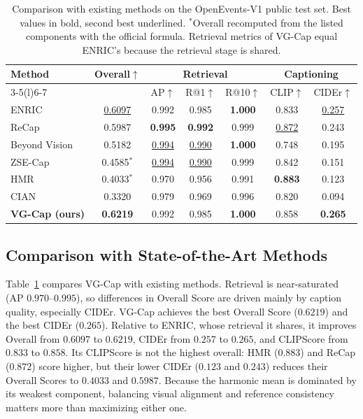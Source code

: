 \documentclass[runningheads]{llncs}
\DeclareRobustCommand{\revise}[1]{{\color{blue}#1}}
\DeclareRobustCommand{\todo}[1]{\ifblank{#1}%
     {{\color{red}\textbf{TBD}}}%
     {{\color{red}\textbf{[TODO:}~#1\textbf{]}}}}
\DeclareRobustCommand{\revise}[1]{#1}
\DeclareRobustCommand{\todo}[1]{\PackageError{revision}{Unresolved TODO}{}}
\begin{document}
\begin{table}[t]
\caption{Comparison with existing methods on the OpenEvents-V1 public test set. Best values in bold, second best underlined. $^{\ast}$Overall recomputed from the listed components with the official formula. \revise{Retrieval metrics of VG-Cap equal ENRIC's because the retrieval stage is shared.}}
\label{tab:sota}
\centering
\footnotesize
\setlength{\tabcolsep}{4pt}
\begin{tabular}{@{}l c ccc cc@{}}
\toprule
\multirow{2}{*}{\textbf{Method}} & \multirow{2}{*}{\textbf{Overall}$\uparrow$} & \multicolumn{3}{c}{\textbf{Retrieval}} & \multicolumn{2}{c}{\textbf{Captioning}} \\
\cmidrule(lr){3-5}\cmidrule(l){6-7}
 & & AP$\uparrow$ & R@1$\uparrow$ & R@10$\uparrow$ & CLIP$\uparrow$ & CIDEr$\uparrow$ \\
\midrule
ENRIC~\cite{enric}                    & \underline{0.6097} & 0.992 & 0.985 & \textbf{1.000} & 0.833 & \underline{0.257} \\
ReCap~\cite{recap}                    & 0.5987 & \textbf{0.995} & \textbf{0.992} & 0.999 & \underline{0.872} & 0.243 \\
Beyond Vision~\cite{quy2025beyond}    & 0.5182 & \underline{0.994} & \underline{0.990} & \textbf{1.000} & 0.748 & 0.195 \\
ZSE-Cap~\cite{dinh2025zsecap}         & 0.4585$^{\ast}$ & \underline{0.994} & \underline{0.990} & 0.999 & 0.842 & 0.151 \\
HMR~\cite{nguyen2026hierarchical}     & 0.4033$^{\ast}$ & 0.970 & 0.956 & 0.991 & \textbf{0.883} & 0.123 \\
CIAN~\cite{hien2026cian}              & 0.3320 & 0.979 & 0.969 & 0.996 & 0.820 & 0.094 \\
\midrule
\textbf{VG-Cap (ours)}                & \textbf{0.6219} & 0.992 & 0.985 & \textbf{1.000} & 0.858 & \textbf{0.265} \\
\bottomrule
\end{tabular}
\end{table}

\subsection{Comparison with State-of-the-Art Methods}
\label{sec:sota}

Table~\ref{tab:sota} compares VG-Cap with existing methods. Retrieval is near-saturated (AP $0.970$--$0.995$), so differences in Overall Score are driven mainly by caption quality, especially CIDEr. VG-Cap achieves the best Overall Score ($0.6219$) and the best CIDEr ($0.265$). Relative to ENRIC, whose retrieval it shares, it improves Overall from $0.6097$ to $0.6219$, CIDEr from $0.257$ to $0.265$, \revise{and CLIPScore from $0.833$ to $0.858$. Its CLIPScore is not the highest overall: HMR ($0.883$) and ReCap ($0.872$) score higher, but their lower CIDEr ($0.123$ and $0.243$) reduces their Overall Scores to $0.4033$ and $0.5987$.} Because the harmonic mean is dominated by its weakest component, balancing visual alignment and reference consistency matters more than maximizing either one.%
\end{document}
